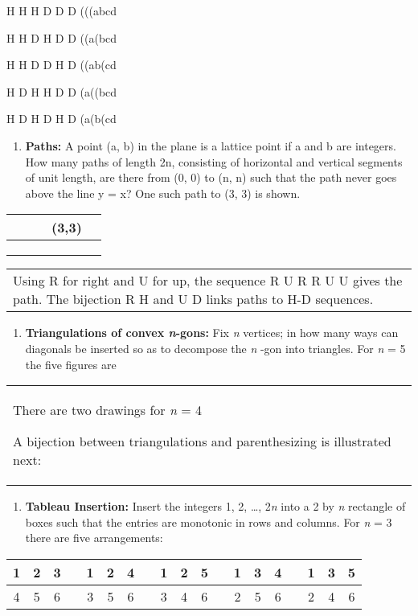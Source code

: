 \documentclass[10pt,letter]{article}
\renewenvironment{quote}
  {\begin{tabular}{|p{13cm}}}
  {\end{tabular}}
\begin{document}
H H H D D D   (((abcd

H H D H D D   ((a(bcd

H H D D H D   ((ab(cd

H D H H D D   (a((bcd

H D H D H D  (a(b(cd
\begin{enumerate}
\def\labelenumi{\Roman{enumi}.}

\item
  \textbf{Paths:} A point (a, b) in the plane is a lattice point if a
  and b are integers. How many paths of length 2n, consisting of
  horizontal and vertical segments of unit length, are there from (0, 0)
  to (n, n) such that the path never goes above the line y = x? One such
  path to (3, 3) is shown.

\end{enumerate}
\begin{longtable}[]{@{}lllll@{}}
\toprule
& & & (3,3) &\tabularnewline
\midrule
\endhead
& & & &\tabularnewline
& & & &\tabularnewline
& & & &\tabularnewline
\bottomrule

\end{longtable}
\begin{quote}
Using R for right and U for up, the sequence R U R R U U gives the path.
The bijection R H and U D links paths to H-D sequences.

\end{quote}
\begin{enumerate}
\def\labelenumi{\Roman{enumi}.}

\item
  \textbf{Triangulations of convex \emph{n}-gons:} Fix \emph{n}
  vertices; in how many ways can diagonals be inserted so as to
  decompose the \emph{n} -gon into triangles. For \emph{n} = 5 the five
  figures are

\end{enumerate}
\begin{quote}
There are two drawings for \emph{n} = 4

A bijection between triangulations and parenthesizing is illustrated
next:

\end{quote}
\begin{enumerate}
\def\labelenumi{\Roman{enumi}.}

\item
  \textbf{Tableau Insertion:} Insert the integers 1, 2, \ldots{},
  2\emph{n} into a 2 by \emph{n} rectangle of boxes such that the
  entries are monotonic in rows and columns. For \emph{n} = 3 there are
  five arrangements:

\end{enumerate}
\begin{longtable}[]{@{}ccccccccccccccccccc@{}}
\toprule
1 & 2 & 3 & & 1 & 2 & 4 & & 1 & 2 & 5 & & 1 & 3 & 4 & & 1 & 3 &
5\tabularnewline
\midrule
\endhead
4 & 5 & 6 & & 3 & 5 & 6 & & 3 & 4 & 6 & & 2 & 5 & 6 & & 2 & 4 &
6\tabularnewline
\bottomrule

\end{longtable}
\end{document}
